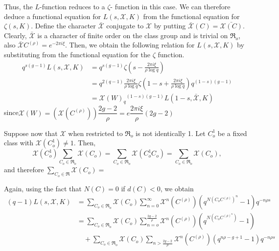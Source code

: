 Thus, the $L$-function reduces to a $\zeta$- function in this case. We
can therefore deduce a functional equation for $L (s, \mathcal{X}, K)$
from the functional equation for $\zeta (s,K)$. Define the character
$\bar{\mathcal{X}}$ conjugate to $\mathcal{X}$ by putting
$\bar{\mathcal{X}} (C) = \bar{\mathcal{X} (C)}$. Clearly,
$\bar{\mathcal{X}}$ is a character of finite order on the class group
and is trivial on $\mathfrak{R}_o$, also $\bar{\mathcal{X}} C^{(\rho)}
= e^{-2 \pi i \xi}$. Then, we obtain the following relation for $L (s,
\mathcal{X}, K)$ by substituting from the functional equation for the
$\zeta$ function. 
\begin{align*}
  q^{s(g-1)} L (s, \mathcal{X} , K) & = q^{s(g-1)} \zeta \left(s-\frac{2
    \pi i \xi}{\rho \log q}\right)\\ 
  & = q^{2 (q-1)} \frac{2 \pi i \xi}{\rho \log q} \zeta \left(1-s + \frac{2
    \pi i \xi}{\rho \log q}\right) q^{(1-s)(g-1)}\\ 
  & = \mathcal{X} (W)_q{^{(1-s) (g-1)}} L (1-s, \bar{\mathcal{X}}, K) 
\end{align*}
since\pageoriginale $\mathcal{X} (W) = (\mathcal{X} (C ^{(\rho)}))
\dfrac{2g-2}{\rho} = e \dfrac{2 \pi i \xi}{\rho} (2g-2)$ 

\begin{Case} %
  Suppose now that $\mathcal{X}$ when restricted to $\mathfrak{R}_o$
  is not identically 1. Let $C^1_o$ be a fixed class with
  $\mathcal{X} (C^1_o) \neq 1$. Then, 
  $$
  \mathcal{X} (C^1_o) \sum_{C_o \in \mathfrak{R}_o} \mathcal{X}
  (C_o)  = \sum_{C_o \in \mathfrak{R}_o}  \mathcal{X} (C_o^1
  C_o) = \sum_{C_o \in \mathfrak{R}_o} \mathcal{X} (C_o), 
  $$
  and therefore $\sum\limits_{C_o \in \mathfrak{R}} \mathcal{X} (C_o) = $  
\end{Case}

Again, using the fact that $N (C)=0$ if $d (C) < 0$, we obtain 
\begin{align*}
  (q-1)L (s, \mathcal{X}, K) & = \sum_{C_o \in \mathfrak{R}_o}
  \mathcal{X} (C_o) \sum^\infty_{n=0} \mathcal{X}^n (C ^{(\rho)}) (q^{N
    (C_o C{^{(\rho)}})^n} -1) q^{-n \rho s}\\
  & =\sum_{C_o \in \mathfrak{R}_o} \mathcal{X} (C_o)
  \sum_{n=o}^{\frac{2g-2}{\rho}} \mathcal{X}^n (C ^{(\rho)}) (q^{N (C_o
  C^{(\rho)^n})}-1)\\ 
  & \quad + \sum_{C_o \in \mathfrak{R}_o} \mathcal{X} (C_o) \sum_{n >
    \frac{2g-2}{\rho}} \mathcal{X}^n (C^{(\rho)}) (q^{n \rho - g+1} -1)
  q^{-n \rho s} 
\end{align*}

